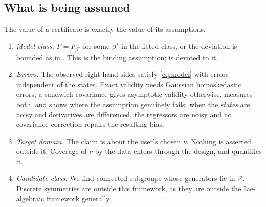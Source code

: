 \subsection{What is being assumed}
\label{sec:assumptions}

The value of a certificate is exactly the value of its assumptions.
\begin{enumerate}\itemsep2pt
\item[(A1)] \emph{Model class.} $F = F_{\beta^\star}$ for some $\beta^\star$ in
  the fitted class, or the deviation is bounded as in .
  This is the binding assumption;  is devoted to it.
\item[(A2)] \emph{Errors.} The observed right-hand sides satisfy
  \eqref{eq:model} with errors independent of the states. Exact validity needs
  Gaussian homoskedastic errors; a sandwich covariance
  \citep{white1980heteroskedasticity} gives asymptotic validity otherwise.
   measures both, and shows where the assumption genuinely fails: when the \emph{states} are noisy and derivatives are differenced, the regressors are noisy and no covariance correction repairs the resulting bias.
\item[(A3)] \emph{Target domain.} The claim is about the user's chosen $\nu$.
  Nothing is asserted outside it. Coverage of $\nu$ by the data enters through
  the design, and  quantifies it.
\item[(A4)] \emph{Candidate class.} We find connected subgroups whose generators
  lie in $\mathcal V$. Discrete symmetries are outside this framework, as they
  are outside the Lie-algebraic framework generally.
\end{enumerate}
